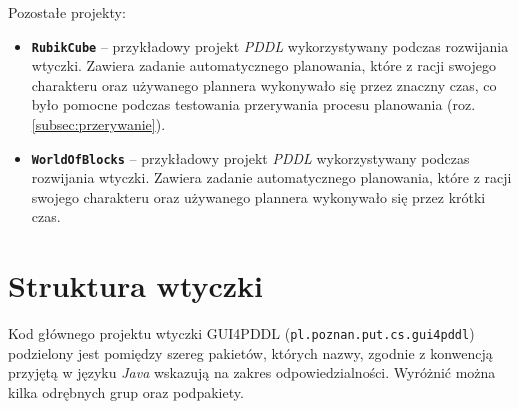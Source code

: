 Pozostałe projekty:
\begin{itemize}
\item \textbf{\texttt{RubikCube}} -- przykładowy projekt \textit{PDDL} wykorzystywany podczas rozwijania wtyczki. Zawiera zadanie automatycznego planowania, które z racji swojego charakteru oraz używanego plannera wykonywało się przez znaczny czas, co było pomocne podczas testowania przerywania procesu planowania (roz. \ref{subsec:przerywanie}).
\item \textbf{\texttt{WorldOfBlocks}} -- przykładowy projekt \textit{PDDL} wykorzystywany podczas rozwijania wtyczki. Zawiera zadanie automatycznego planowania, które z racji swojego charakteru oraz używanego plannera wykonywało się przez krótki czas.
\end{itemize}

\section{Struktura wtyczki}
\label{sec:struktura}

Kod głównego projektu wtyczki GUI4PDDL (\texttt{pl.poznan.put.cs.gui4pddl}) podzielony jest pomiędzy szereg pakietów, których nazwy, zgodnie z konwencją przyjętą w języku \textit{Java} wskazują na zakres odpowiedzialności. Wyróżnić można kilka odrębnych grup oraz podpakiety.

